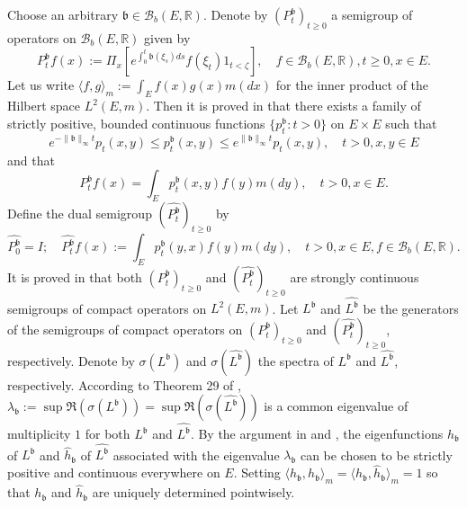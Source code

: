 \documentclass[12pt,a4paper]{amsart}
\numberwithin{equation}{section}
\theoremstyle{plain}
\theoremstyle{definition}
\theoremstyle{remark}
\begin{document}
	Choose an arbitrary $ \mathfrak b\in \mathcal B_b(E,\mathbb R)$.
	Denote by $(P_t^\mathfrak b)_{t\geq 0}$ a semigroup of operators on $\mathcal B_b(E,\mathbb R)$ given by
\begin{equation}
	P_t^\mathfrak b f(x)
	:= \Pi_x[e^{\int_0^t \mathfrak b(\xi_s)ds} f(\xi_t) 1_{t< \zeta}],
	\quad f\in \mathcal B_b(E, \mathbb R), t\geq 0, x\in E.
\end{equation}
	Let us write $\langle f,g \rangle_m:= \int_E f(x)g(x) m(dx)$ for  the inner product of the Hilbert space $L^2(E,m)$.
	Then it is proved in \cite{RenSongZhang2015Limit, RenSongZhang2017Central} that there exists a family of strictly positive, bounded continuous functions $\{p_t^\mathfrak b: t> 0\}$ on $E\times E$ such that
\begin{equation} \label{eq:IU.0}
	e^{-\|\mathfrak b\|_\infty t} p_t(x,y)
	\leq p_t^\mathfrak b(x,y) \leq e^{\|\mathfrak b\|_\infty t}p_t(x,y),
	\quad t>0, x,y\in E
\end{equation}
	and that
\begin{equation}
	P_t^\mathfrak b f(x)
	= \int_E p_t^\mathfrak b(x,y) f(y) m(dy),
	\quad t>0, x\in E.
\end{equation}
	Define the dual semigroup $(\widehat {P^{\mathfrak b}_t} )_{t\geq 0}$ by
\begin{equation}
	\widehat {P_0^{\mathfrak b}}
	= I;
	\quad \widehat {P_t^{\mathfrak b}} f(x)
	:= \int_E p_t^\mathfrak b(y,x) f(y) m(dy),
	\quad t>0,x\in E, f\in \mathcal B_b(E,\mathbb R).
\end{equation}
	It is proved in \cite{RenSongZhang2015Limit, RenSongZhang2017Central} that both $(P_t^\mathfrak b)_{t\geq 0}$ and $(\widehat {P_t^\mathfrak b})_{t\geq 0}$ are strongly continuous semigroups of compact operators on $L^2(E,m)$.	
	Let $L^\mathfrak b$ and $\widehat {L^\mathfrak b}$ be the generators of the semigroups of compact operators on $(P_t^\mathfrak b)_{t\geq 0}$ and $(\widehat {P_t^\mathfrak b})_{t\geq 0}$, respectively.
	Denote by $\sigma(L^\mathfrak b)$ and $\sigma(\widehat{L^\mathfrak b})$ the spectra of $L^\mathfrak b$ and $\widehat {L^{\mathfrak b}}$, respectively.
	According to Theorem 29 of \cite{Schaefer1974Banach}, $\lambda_\mathfrak b:= \sup \Re(\sigma(L^\mathfrak b)) = \sup \Re(\sigma( \widehat{L^\mathfrak b})) $ is a common eigenvalue of multiplicity $1$ for both $L^\mathfrak b$ and $\widehat {L^{\mathfrak b}}$.
	By the argument in \cite{RenSongZhang2015Limit} and \cite{RenSongZhang2017Central}, the eigenfunctions $h_\mathfrak b$ of $L^\mathfrak b$ and $\widehat h_\mathfrak b$ of $\widehat{L^\mathfrak b}$ associated with the eigenvalue $\lambda_\mathfrak b$ can be chosen to be strictly positive and continuous everywhere on $E$.
	Setting $\langle h_\mathfrak b,h_\mathfrak b\rangle_m = \langle h_\mathfrak b, \widehat h_\mathfrak b\rangle_m = 1$ so that $h_\mathfrak b$ and $\widehat h_\mathfrak b$ are uniquely determined pointwisely.
\end{document}
